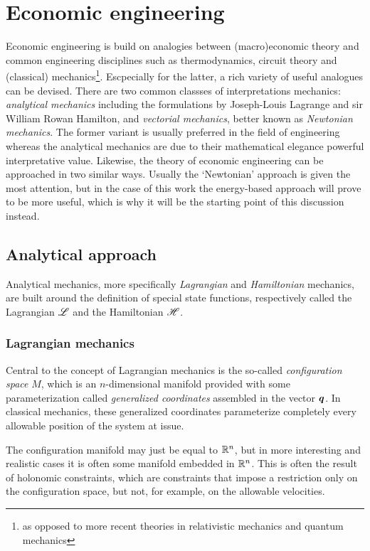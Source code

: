 \chapter{Economic engineering}
Economic engineering is build on analogies between (macro)economic theory and common engineering disciplines such as thermodynamics, circuit theory and (classical) mechanics\footnote{as opposed to more recent theories in relativistic mechanics and quantum mechanics}. Escpecially for the latter, a rich variety of useful analogues can be devised. There are two common classses of interpretations mechanics: \emph{analytical mechanics} including the formulations by Joseph-Louis Lagrange and sir William Rowan Hamilton, and \emph{vectorial mechanics}, better known as \emph{Newtonian mechanics}. The former variant is usually preferred in the field of engineering whereas the analytical mechanics are due to their mathematical elegance powerful interpretative value. Likewise, the theory of economic engineering can be approached in two similar ways. Usually the `Newtonian' approach is given the most attention, but in the case of this work the energy-based approach will prove to be more useful, which is why it will be the starting point of this discussion instead.

\section{Analytical approach}
Analytical mechanics, more specifically \emph{Lagrangian} and \emph{Hamiltonian} mechanics, are built around the definition of special state functions, respectively called the Lagrangian \(\mathscr{L}\) and the Hamiltonian \(\mathscr{H}\).

\subsection{Lagrangian mechanics}
Central to the concept of Lagrangian mechanics is the so-called \emph{configuration space} \(M\), which is an \(n\)-dimensional manifold provided with some parameterization called \emph{generalized coordinates} assembled in the vector \(\vb*{q}\). In classical mechanics, these generalized coordinates parameterize completely every allowable position of the system at issue. 

The configuration manifold may just be equal to \(\mathbb{R}^n\), but in more interesting and realistic cases it is often some manifold embedded in \(\mathbb{R}^n\). This is often the result of holonomic constraints, which are constraints that impose a restriction only on the configuration space, but not, for example, on the allowable velocities.

